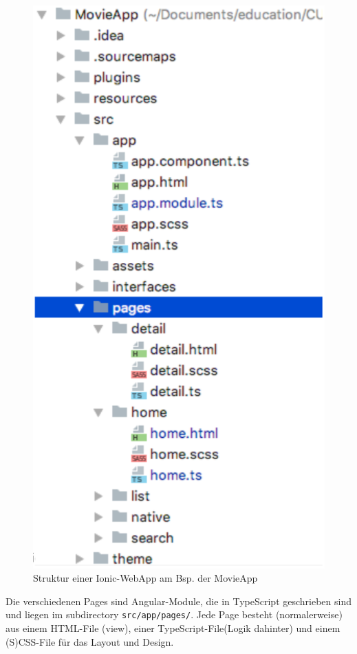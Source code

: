 \documentclass[a4paper, 11pt]{article}
\newcommand{\code}[1]{\texttt{#1}}
\begin{document}
\begin{figure}
	\centering
	\includegraphics[keepaspectratio=true,height=18\baselineskip]{ionic_structure.PNG}
	\caption{Struktur einer Ionic-WebApp am Bsp. der MovieApp}
	\label{fig:ionic-struct}
\end{figure}
Die verschiedenen Pages sind Angular-Module, die in TypeScript geschrieben sind und liegen im subdirectory \code{src/app/pages/}. Jede Page besteht (normalerweise) aus einem HTML-File (view), einer TypeScript-File(Logik dahinter) und einem (S)CSS-File für das Layout und Design.
\vspace{10px}
\end{document}
